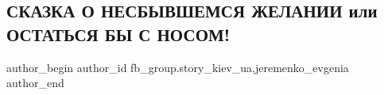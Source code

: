  
 
 
 
 
 
\subsection{СКАЗКА О НЕСБЫВШЕМСЯ ЖЕЛАНИИ или ОСТАТЬСЯ БЫ С НОСОМ!}
\label{sec:18_11_2021.fb.fb_group.story_kiev_ua.2.ostatjsja_s_nosom_skazka}
 
\ifcmt
 author_begin
   author_id fb_group.story_kiev_ua,jeremenko_evgenia
 author_end
\fi

